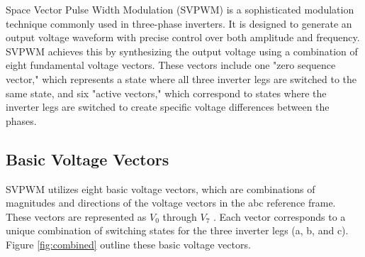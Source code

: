 Space Vector Pulse Width Modulation (SVPWM) is a sophisticated modulation
technique commonly used in three-phase inverters. It is designed to generate an
output voltage waveform with precise control over both amplitude and frequency.
SVPWM achieves this by synthesizing the output voltage using a combination of
eight fundamental voltage vectors. These vectors include one "zero sequence
vector," which represents a state where all three inverter legs are switched to
the same state, and six "active vectors," which correspond to states where the
inverter legs are switched to create specific voltage differences between the
phases.

\subsection{Basic Voltage Vectors}
SVPWM utilizes eight basic voltage vectors, which are combinations of
magnitudes and directions of the voltage vectors in the abc reference frame.
These vectors are represented as $V_0$ through $V_7$ . Each vector corresponds
to a unique combination of switching states for the three inverter legs (a, b,
and c). Figure \ref{fig:combined} outline these basic voltage vectors.\\
